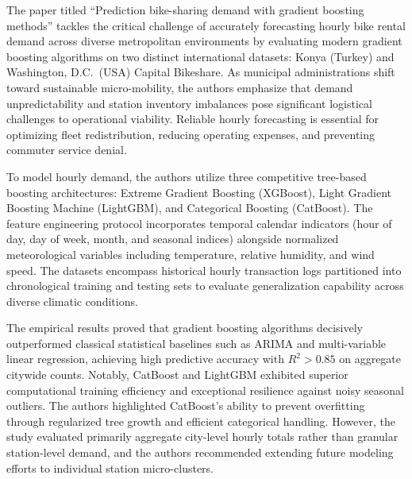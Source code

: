 \documentclass[12pt, a4paper]{article}
\renewcommand{\_}{\textunderscore\allowbreak}
\begin{document}
The paper titled ``Prediction bike-sharing demand with gradient boosting methods'' tackles the critical challenge of accurately forecasting hourly bike rental demand across diverse metropolitan environments by evaluating modern gradient boosting algorithms on two distinct international datasets: Konya (Turkey) and Washington, D.C.\ (USA) Capital Bikeshare. As municipal administrations shift toward sustainable micro-mobility, the authors emphasize that demand unpredictability and station inventory imbalances pose significant logistical challenges to operational viability. Reliable hourly forecasting is essential for optimizing fleet redistribution, reducing operating expenses, and preventing commuter service denial.

To model hourly demand, the authors utilize three competitive tree-based boosting architectures: Extreme Gradient Boosting (XGBoost), Light Gradient Boosting Machine (LightGBM), and Categorical Boosting (CatBoost). The feature engineering protocol incorporates temporal calendar indicators (hour of day, day of week, month, and seasonal indices) alongside normalized meteorological variables including temperature, relative humidity, and wind speed. The datasets encompass historical hourly transaction logs partitioned into chronological training and testing sets to evaluate generalization capability across diverse climatic conditions.

The empirical results proved that gradient boosting algorithms decisively outperformed classical statistical baselines such as ARIMA and multi-variable linear regression, achieving high predictive accuracy with $R^2 > 0.85$ on aggregate citywide counts. Notably, CatBoost and LightGBM exhibited superior computational training efficiency and exceptional resilience against noisy seasonal outliers. The authors highlighted CatBoost's ability to prevent overfitting through regularized tree growth and efficient categorical handling. However, the study evaluated primarily aggregate city-level hourly totals rather than granular station-level demand, and the authors recommended extending future modeling efforts to individual station micro-clusters.
\end{document}
